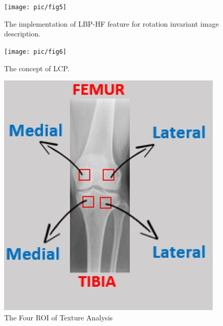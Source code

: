 \documentclass[review]{elsarticle}
\begin{document}
\begin{figure}[h]
	\centering
	\texttt{[image: pic/fig5]}
	\caption{The implementation of LBP-HF feature for rotation invariant image description.}
	\label{fig:LBP-HF}
\end{figure}
\vspace{1 cm}
\begin{figure}[h!]
	\centering
	\texttt{[image: pic/fig6]}
	\caption{The concept of LCP.}
	\label{fig:LCP}
\end{figure} 
\vspace{1 cm}
\begin{figure}[h]
	\centering
	\includegraphics[width=0.5\linewidth]{pic/fig9}
	\caption{The Four ROI of Texture Analysis}
	\label{fig:fig9}
\end{figure}
\end{document}
